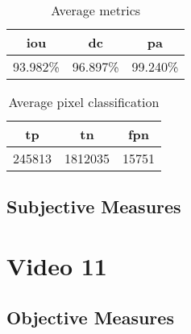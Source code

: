 \begin{minipage}[c]{0.475\textwidth}
\begin{table}[H]
    \centering
    \begin{tabular}{||c c c||} 
        \hline
        \acrshort{iou} & \acrshort{dc} & \acrshort{pa} \\ [0.5ex] 
        \hline\hline
        93.982\% & 96.897\% & 99.240\% \\ [1ex] 
        \hline
    \end{tabular}
    \caption{Average metrics}
    \label{tab:metrics_video_10}
\end{table}
\end{minipage}
\begin{minipage}[c]{0.475\textwidth}
\begin{table}[H]
    \centering
    \begin{tabular}{||c c c||} 
        \hline
        \acrshort{tp} & \acrshort{tn} & \acrshort{fpn} \\ [0.5ex] 
        \hline\hline
        245813 & 1812035 & 15751 \\ [1ex] 
        \hline
    \end{tabular}
    \caption{Average pixel classification}
    \label{tab:pixels_video_10}
\end{table}
\end{minipage}

\subsection{Subjective Measures}


\section{Video 11}
\subsection{Objective Measures}


